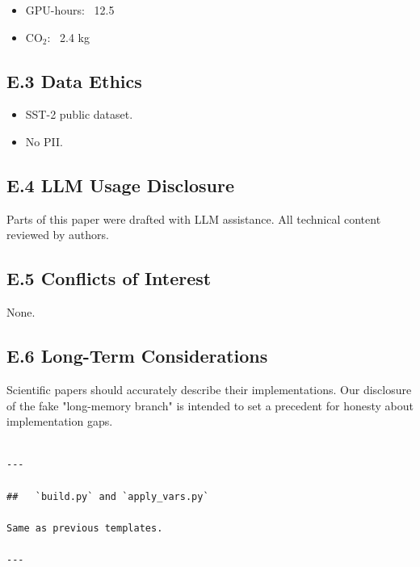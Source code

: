\begin{itemize}
\item GPU-hours: ~12.5
\item CO$_2$: ~2.4 kg

\end{itemize}
\subsection{E.3 Data Ethics}

\begin{itemize}
\item SST-2 public dataset.
\item No PII.

\end{itemize}
\subsection{E.4 LLM Usage Disclosure}

Parts of this paper were drafted with LLM assistance. All technical content 
reviewed by authors.

\subsection{E.5 Conflicts of Interest}

None.

\subsection{E.6 Long-Term Considerations}

Scientific papers should accurately describe their implementations. Our 
disclosure of the fake "long-memory branch" is intended to set a precedent 
for honesty about implementation gaps.
\begin{lstlisting}

---

##   `build.py` and `apply_vars.py`

Same as previous templates.

---
\end{lstlisting}